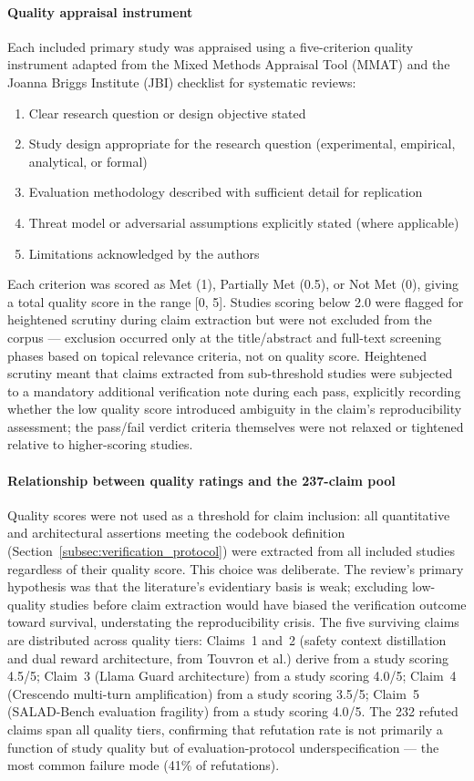 \paragraph{Quality appraisal instrument}
Each included primary study was appraised using a five-criterion quality instrument adapted from the Mixed Methods Appraisal Tool (MMAT) and the Joanna Briggs Institute (JBI) checklist for systematic reviews:
\begin{enumerate}
  \item Clear research question or design objective stated
  \item Study design appropriate for the research question (experimental, empirical, analytical, or formal)
  \item Evaluation methodology described with sufficient detail for replication
  \item Threat model or adversarial assumptions explicitly stated (where applicable)
  \item Limitations acknowledged by the authors
\end{enumerate}
Each criterion was scored as Met (1), Partially Met (0.5), or Not Met (0), giving a total quality score in the range [0, 5].
Studies scoring below 2.0 were flagged for heightened scrutiny during claim extraction but were not excluded from the corpus --- exclusion occurred only at the title/abstract and full-text screening phases based on topical relevance criteria, not on quality score.
Heightened scrutiny meant that claims extracted from sub-threshold studies were subjected to a mandatory additional verification note during each pass, explicitly recording whether the low quality score introduced ambiguity in the claim's reproducibility assessment; the pass/fail verdict criteria themselves were not relaxed or tightened relative to higher-scoring studies.

\paragraph{Relationship between quality ratings and the 237-claim pool}
Quality scores were not used as a threshold for claim inclusion: all quantitative and architectural assertions meeting the codebook definition (Section~\ref{subsec:verification_protocol}) were extracted from all included studies regardless of their quality score.
This choice was deliberate.
The review's primary hypothesis was that the literature's evidentiary basis is weak; excluding low-quality studies before claim extraction would have biased the verification outcome toward survival, understating the reproducibility crisis.
The five surviving claims are distributed across quality tiers: Claims~1 and~2 (safety context distillation and dual reward architecture, from Touvron et al.) derive from a study scoring 4.5/5; Claim~3 (Llama Guard architecture) from a study scoring 4.0/5; Claim~4 (Crescendo multi-turn amplification) from a study scoring 3.5/5; Claim~5 (SALAD-Bench evaluation fragility) from a study scoring 4.0/5.
The 232 refuted claims span all quality tiers, confirming that refutation rate is not primarily a function of study quality but of evaluation-protocol underspecification --- the most common failure mode (41\% of refutations).

